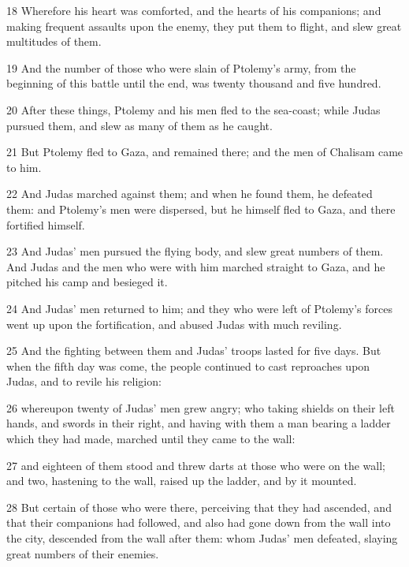 \par 18 Wherefore his heart was comforted, and the hearts of his companions; and making frequent assaults upon the enemy, they put them to flight, and slew great multitudes of them. 

\par 19 And the number of those who were slain of Ptolemy’s army, from the beginning of this battle until the end, was twenty thousand and five hundred. 

\par 20 After these things, Ptolemy and his men fled to the sea-coast; while Judas pursued them, and slew as many of them as he caught. 

\par 21 But Ptolemy fled to Gaza, and remained there; and the men of Chalisam came to him. 

\par 22 And Judas marched against them; and when he found them, he defeated them: and Ptolemy’s men were dispersed, but he himself fled to Gaza, and there fortified himself. 

\par 23 And Judas’ men pursued the flying body, and slew great numbers of them. And Judas and the men who were with him marched straight to Gaza, and he pitched his camp and besieged it. 

\par 24 And Judas’ men returned to him; and they who were left of Ptolemy’s forces went up upon the fortification, and abused Judas with much reviling. 

\par 25 And the fighting between them and Judas’ troops lasted for five days. But when the fifth day was come, the people continued to cast reproaches upon Judas, and to revile his religion: 

\par 26 whereupon twenty of Judas’ men grew angry; who taking shields on their left hands, and swords in their right, and having with them a man bearing a ladder which they had made, marched until they came to the wall: 

\par 27 and eighteen of them stood and threw darts at those who were on the wall; and two, hastening to the wall, raised up the ladder, and by it mounted. 

\par 28 But certain of those who were there, perceiving that they had ascended, and that their companions had followed, and also had gone down from the wall into the city, descended from the wall after them: whom Judas’ men defeated, slaying great numbers of their enemies. 

